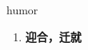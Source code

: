 
\begin{frame}
{\huge humor}
\begin{center}
\begin{enumerate}\Large
  \item \textbf{迎合，迁就}
\end{enumerate}
\end{center}
\end{frame}
